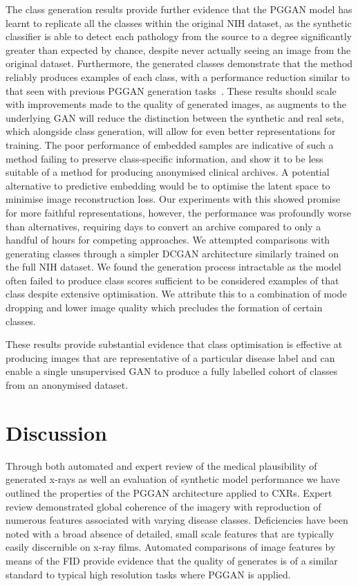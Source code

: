 \documentclass{article}
\begin{document}
The class generation results provide further evidence that the PGGAN model has learnt to replicate all the classes within the original NIH dataset, as the synthetic classifier is able to detect each pathology from the source to a degree significantly greater than expected by chance, despite never actually seeing an image from the original dataset. Furthermore, the generated classes demonstrate that the method reliably produces examples of each class, with a performance reduction similar to that seen with previous PGGAN generation tasks~\cite{togoSyntheticGastritisImage2019}. These results should scale with improvements made to the quality of generated images, as augments to the underlying GAN will reduce the distinction between the synthetic and real sets, which alongside class generation, will allow for even better representations for training. The poor performance of embedded samples are indicative of such a method failing to preserve class-specific information, and show it to be less suitable of a method for producing anonymised clinical archives. A potential alternative to predictive embedding would be to optimise the latent space to minimise image reconstruction loss. Our experiments with this showed promise for more faithful representations, however, the performance was profoundly worse than alternatives, requiring days to convert an archive compared to only a handful of hours for competing approaches. We attempted comparisons with generating classes through a simpler DCGAN architecture similarly trained on the full NIH dataset. We found the generation process intractable as the model often failed to produce class scores sufficient to be considered examples of that class despite extensive optimisation. We attribute this to a combination of mode dropping and lower image quality which precludes the formation of certain classes.

These results provide substantial evidence that class optimisation is effective at producing images that are representative of a particular disease label and can enable a single unsupervised GAN to produce a fully labelled cohort of classes from an anonymised dataset. 

\section{Discussion}
\label{sec:discussion}
Through both automated and expert review of the medical plausibility of generated x-rays as well an evaluation of synthetic model performance we have outlined the properties of the PGGAN architecture applied to CXRs. Expert review demonstrated global coherence of the imagery with reproduction of numerous features associated with varying disease classes. Deficiencies have been noted with a broad absence of detailed, small scale features that are typically easily discernible on x-ray films. Automated comparisons of image features by means of the FID provide evidence that the quality of generates is of a similar standard to typical high resolution tasks where PGGAN is applied.
\end{document}
